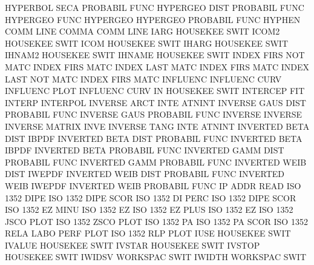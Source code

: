 HYPERBOL SECA                           PROBABIL FUNC
HYPERGEO DIST                           PROBABIL FUNC
HYPERGEO FUNC                           HYPERGEO
HYPERGEO                                PROBABIL FUNC
HYPHEN   COMM LINE                      COMMA    COMM LINE
IARG                                    HOUSEKEE SWIT
ICOM2                                   HOUSEKEE SWIT
ICOM                                    HOUSEKEE SWIT
IHARG                                   HOUSEKEE SWIT
IHNAM2                                  HOUSEKEE SWIT
IHNAME                                  HOUSEKEE SWIT
INDEX    FIRS NOT  MATC                 INDEX    FIRS MATC
INDEX    LAST MATC                      INDEX    FIRS MATC
INDEX    LAST NOT  MATC                 INDEX    FIRS MATC
INFLUENC                                INFLUENC CURV
INFLUENC PLOT                           INFLUENC CURV
IN                                      HOUSEKEE SWIT
INTERCEP                                FIT
INTERP                                  INTERPOL
INVERSE  ARCT INTE                      ATNINT
INVERSE  GAUS DIST                      PROBABIL FUNC
INVERSE  GAUS                           PROBABIL FUNC
INVERSE                                 INVERSE
INVERSE                                 MATRIX   INVE
INVERSE  TANG INTE                      ATNINT
INVERTED BETA DIST                      IBPDF
INVERTED BETA DIST                      PROBABIL FUNC
INVERTED BETA                           IBPDF
INVERTED BETA                           PROBABIL FUNC
INVERTED GAMM DIST                      PROBABIL FUNC
INVERTED GAMM                           PROBABIL FUNC
INVERTED WEIB DIST                      IWEPDF
INVERTED WEIB DIST                      PROBABIL FUNC
INVERTED WEIB                           IWEPDF
INVERTED WEIB                           PROBABIL FUNC
IP       ADDR                           READ
ISO      1352 DIPE                      ISO      1352 DIPE SCOR
ISO      1352 DI   PERC                 ISO      1352 DIPE SCOR
ISO      1352 EZ   MINU                 ISO      1352 EZ
ISO      1352 EZ   PLUS                 ISO      1352 EZ
ISO      1352 JSCO PLOT                 ISO      1352 ZSCO PLOT
ISO      1352 PA                        ISO      1352 PA   SCOR
ISO      1352 RELA LABO PERF PLOT       ISO      1352 RLP  PLOT
IUSE                                    HOUSEKEE SWIT
IVALUE                                  HOUSEKEE SWIT
IVSTAR                                  HOUSEKEE SWIT
IVSTOP                                  HOUSEKEE SWIT
IWIDSV                                  WORKSPAC SWIT
IWIDTH                                  WORKSPAC SWIT
